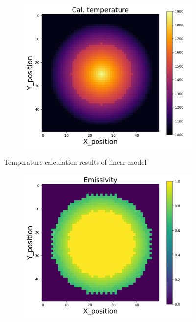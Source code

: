 {\begin{figure}[p]
\begin{minipage}{\textwidth}
\begin{subfigure}{0.325\textwidth}
        \end{subfigure}
        \begin{subfigure}{0.325\textwidth}
            \centering
            \includegraphics[width=\textwidth]{figures/raw_data/33/linear/T_cal.jpg}
        \end{subfigure}
    \end{minipage}
    \caption{Temperature calculation results of linear model}  
\end{figure}
\begin{figure}[p]
    \centering
    \begin{minipage}{\textwidth}
        \centering
        \begin{subfigure}{0.325\textwidth}
            \centering
            \includegraphics[width=\textwidth]{figures/raw_data/0/linear/emi_cal.jpg}

\end{subfigure}
\end{minipage}
\end{figure}}
